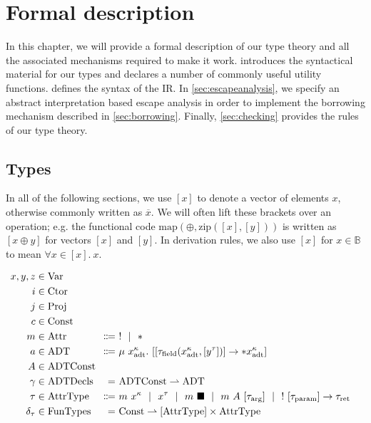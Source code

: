 \chapter{Formal description}\label{sec:theory}

In this chapter, we will provide a formal description of our type theory and all the associated mechanisms required to make it work.  introduces the syntactical material for our types and declares a number of commonly useful utility functions.  defines the syntax of the IR. In \cref{sec:escapeanalysis}, we specify an abstract interpretation based escape analysis in order to implement the borrowing mechanism described in \cref{sec:borrowing}. Finally, \cref{sec:checking} provides the rules of our type theory.

\newcommand{\sep}{\ \ |\ \ }
\newcommand{\icode}[1]{\textrm{\lstinline[language=ir-if]|#1|}}

\section{Types}\label{sec:types}
In all of the following sections, we use $[x]$ to denote a vector of elements $x$, otherwise commonly written as $\overline{x}$. We will often lift these brackets over an operation; e.g. the functional code $\mathrm{map}(\oplus, \mathrm{zip}([x], [y]))$ is written as $[x \oplus y]$ for vectors $[x]$ and $[y]$. In derivation rules, we also use $[x]$ for $x \in \mathbb{B}$ to mean $\forall x \in [x].\ x$.

\newcommand{\dom}{\mathrm{dom}}
\newcommand{\Var}{\mathrm{Var}}
\newcommand{\Ctor}{\mathrm{Ctor}}
\newcommand{\Proj}{\mathrm{Proj}}
\newcommand{\Const}{\mathrm{Const}}
\newcommand{\Attr}{\mathrm{Attr}}
\newcommand{\ADT}{\mathrm{ADT}}
\newcommand{\adt}{\mathrm{adt}}
\newcommand{\field}{\mathrm{field}}
\newcommand{\ADTConst}{\mathrm{ADTConst}}
\newcommand{\AttrType}{\mathrm{AttrType}}
\newcommand{\arrg}{\mathrm{arg}}
\newcommand{\param}{\mathrm{param}}
\newcommand{\ret}{\mathrm{ret}}
\newcommand{\ADTDecls}{\mathrm{ADTDecls}}
\newcommand{\FunTypes}{\mathrm{FunTypes}}

\begin{alignat*}{2}
  x, y, z &\in \Var \\
  i &\in \Ctor \\
  j &\in \Proj \\
  c &\in \Const \\
  m &\in \Attr &\Coloneqq&\ ! \sep * \\
  a &\in \ADT &\Coloneqq&\ \mu\ x^\kappa_\adt.\ [[\tau_\field(x^\kappa_\adt, [y^\tau])] \to *x^\kappa_\adt] \\
  A &\in \mathrlap{\ADTConst} \\
  \gamma &\in \ADTDecls &=&\ \ADTConst \rightharpoonup \ADT \\
  \tau &\in \AttrType &\Coloneqq&\ m\ x^\kappa \sep x^\tau \sep m\ \blacksquare \sep m\ A\ [\tau_\arrg] \sep !\ [\tau_\param] \to \tau_\ret \\
  \delta_\tau &\in \FunTypes &=&\ \Const \rightharpoonup [\AttrType] \times \AttrType
\end{alignat*}

